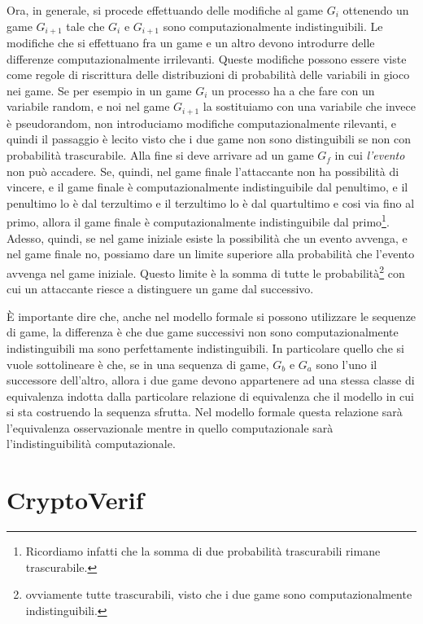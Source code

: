 \documentclass[a4paper,openright,twoside,12pt]{report}
\begin{document}
Ora, in generale, si procede effettuando delle modifiche al game $G_i$ ottenendo un game $G_{i+1}$ 
tale che $G_i$ e $G_{i+1}$ sono computazionalmente indistinguibili. Le modifiche che si effettuano fra un game e un altro devono introdurre delle differenze computazionalmente irrilevanti.
Queste modifiche possono essere viste come regole di riscrittura delle distribuzioni di probabilit\`a delle variabili in gioco nei game.
Se per esempio in un game $G_i$ un processo ha a che fare con un variabile random, e noi nel game $G_{i+1}$ la sostituiamo con una variabile che invece \`e pseudorandom, non introduciamo
modifiche computazionalmente rilevanti, e quindi il passaggio \`e lecito visto che i due game non sono distinguibili se non con probabilit\`a trascurabile.
Alla fine si deve arrivare ad un game $G_f$ in cui \emph{l'evento} non pu\`o accadere. Se, quindi, nel game finale l'attaccante non ha possibilit\`a di vincere, e il game finale
\`e computazionalmente indistinguibile dal penultimo, e il penultimo lo \`e dal terzultimo e il terzultimo lo \`e dal quartultimo e cosi via fino al primo, allora
il game finale \`e computazionalmente indistinguibile dal primo\footnote{Ricordiamo infatti che la somma di due probabilit\`a trascurabili rimane trascurabile.}. 
Adesso, quindi, se nel game iniziale esiste la possibilit\`a che un evento avvenga, e nel game finale no,
possiamo dare un limite superiore alla probabilit\`a che l'evento avvenga nel game iniziale. Questo limite \`e la somma di tutte le probabilit\`a\footnote{ovviamente tutte trascurabili, 
visto che i due game sono computazionalmente indistinguibili.} con cui un attaccante riesce a distinguere un game dal successivo.

\`E importante dire che, anche nel modello formale si possono utilizzare le sequenze di game, la differenza \`e che due game successivi non sono computazionalmente indistinguibili 
ma sono perfettamente indistinguibili. In particolare quello che si vuole sottolineare \`e che, se in una sequenza di game, $G_b$ e $G_a$ sono l'uno il successore dell'altro, 
allora i due game 
devono appartenere ad una stessa classe di equivalenza indotta dalla particolare relazione di equivalenza che il modello in cui si sta costruendo la sequenza sfrutta.
Nel modello formale questa relazione sar\`a l'equivalenza osservazionale mentre in quello computazionale sar\`a l'indistinguibilit\`a computazionale.
\chapter{CryptoVerif}
\end{document}
